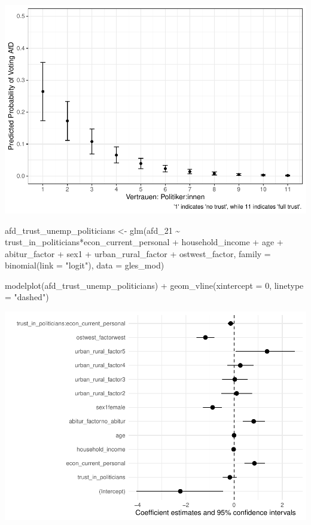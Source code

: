 \documentclass[
]{article}
\newenvironment{Shaded}{\begin{snugshade}}{\end{snugshade}}
\newcommand{\AttributeTok}[1]{\textcolor[rgb]{0.77,0.63,0.00}{#1}}
\newcommand{\DecValTok}[1]{\textcolor[rgb]{0.00,0.00,0.81}{#1}}
\newcommand{\FunctionTok}[1]{\textcolor[rgb]{0.00,0.00,0.00}{#1}}
\newcommand{\NormalTok}[1]{#1}
\newcommand{\OtherTok}[1]{\textcolor[rgb]{0.56,0.35,0.01}{#1}}
\newcommand{\SpecialCharTok}[1]{\textcolor[rgb]{0.00,0.00,0.00}{#1}}
\newcommand{\StringTok}[1]{\textcolor[rgb]{0.31,0.60,0.02}{#1}}
\begin{document}
\includegraphics{AVCD_Final_Assignment-Edenhofer_latest_files/figure-latex/afd-trust-politicians-1.pdf}

\begin{Shaded}
\begin{Highlighting}[]
\NormalTok{afd\_trust\_unemp\_politicians }\OtherTok{\textless{}{-}} \FunctionTok{glm}\NormalTok{(afd\_21 }\SpecialCharTok{\textasciitilde{}}\NormalTok{ trust\_in\_politicians}\SpecialCharTok{*}\NormalTok{econ\_current\_personal }\SpecialCharTok{+}\NormalTok{ household\_income }\SpecialCharTok{+}\NormalTok{ age }\SpecialCharTok{+}\NormalTok{ abitur\_factor }\SpecialCharTok{+}\NormalTok{ sex1 }\SpecialCharTok{+}\NormalTok{ urban\_rural\_factor }\SpecialCharTok{+}\NormalTok{ ostwest\_factor, }\AttributeTok{family =} \FunctionTok{binomial}\NormalTok{(}\AttributeTok{link =} \StringTok{"logit"}\NormalTok{), }\AttributeTok{data =}\NormalTok{ gles\_mod)}

\FunctionTok{modelplot}\NormalTok{(afd\_trust\_unemp\_politicians) }\SpecialCharTok{+}
  \FunctionTok{geom\_vline}\NormalTok{(}\AttributeTok{xintercept =} \DecValTok{0}\NormalTok{, }\AttributeTok{linetype =} \StringTok{"dashed"}\NormalTok{)}
\end{Highlighting}
\end{Shaded}

\includegraphics{AVCD_Final_Assignment-Edenhofer_latest_files/figure-latex/unnamed-chunk-1-1.pdf}
\end{document}
